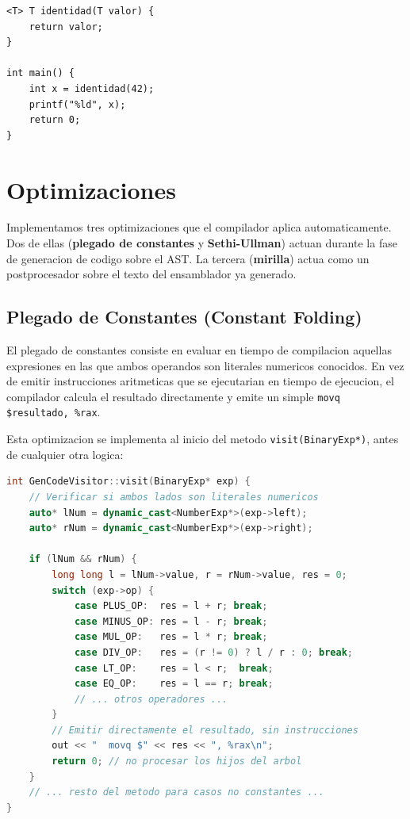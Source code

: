 \documentclass[12pt, a4paper]{article}
\begin{document}
\begin{lstlisting}[style=csstyle, caption={Funcion generica en CS\#}]
<T> T identidad(T valor) {
    return valor;
}

int main() {
    int x = identidad(42);
    printf("%ld", x);
    return 0;
}
\end{lstlisting}

\newpage

\section{Optimizaciones}

Implementamos tres optimizaciones que el compilador aplica automaticamente. Dos de ellas (\textbf{plegado de constantes} y \textbf{Sethi-Ullman}) actuan durante la fase de generacion de codigo sobre el AST. La tercera (\textbf{mirilla}) actua como un postprocesador sobre el texto del ensamblador ya generado.

\subsection{Plegado de Constantes (Constant Folding)}

El plegado de constantes consiste en evaluar en tiempo de compilacion aquellas expresiones en las que ambos operandos son literales numericos conocidos. En vez de emitir instrucciones aritmeticas que se ejecutarian en tiempo de ejecucion, el compilador calcula el resultado directamente y emite un simple \texttt{movq \$resultado, \%rax}.

Esta optimizacion se implementa al inicio del metodo \texttt{visit(BinaryExp*)}, antes de cualquier otra logica:

\begin{lstlisting}[language=C++, style=cppstyle, caption={Implementacion del plegado de constantes}]
int GenCodeVisitor::visit(BinaryExp* exp) {
    // Verificar si ambos lados son literales numericos
    auto* lNum = dynamic_cast<NumberExp*>(exp->left);
    auto* rNum = dynamic_cast<NumberExp*>(exp->right);

    if (lNum && rNum) {
        long long l = lNum->value, r = rNum->value, res = 0;
        switch (exp->op) {
            case PLUS_OP:  res = l + r; break;
            case MINUS_OP: res = l - r; break;
            case MUL_OP:   res = l * r; break;
            case DIV_OP:   res = (r != 0) ? l / r : 0; break;
            case LT_OP:    res = l < r;  break;
            case EQ_OP:    res = l == r; break;
            // ... otros operadores ...
        }
        // Emitir directamente el resultado, sin instrucciones
        out << "  movq $" << res << ", %rax\n";
        return 0; // no procesar los hijos del arbol
    }
    // ... resto del metodo para casos no constantes ...
}
\end{lstlisting}
\end{document}
